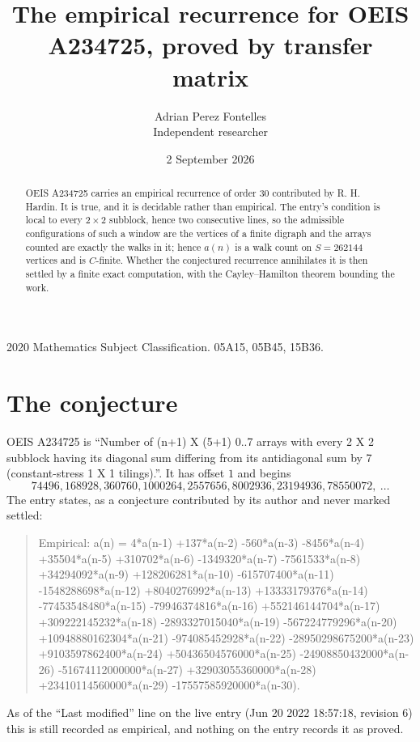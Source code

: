 \documentclass[11pt,a4paper]{article}
\title{The empirical recurrence for OEIS A234725, proved by transfer matrix}
\author{Adrian Perez Fontelles\\ \small Independent researcher}
\date{2 September 2026}
\theoremstyle{plain}
\theoremstyle{definition}
\begin{document}
\maketitle

\begin{abstract}
OEIS A234725 carries an empirical recurrence of order $30$ contributed by R. H. Hardin. It is
true, and it is decidable rather than empirical. The entry's condition is local to every $2\times2$ subblock, hence two consecutive lines, so
the admissible configurations of such a window are the vertices of a finite digraph and the
arrays counted are exactly the walks in it; hence $a(n)$ is a walk count on $S=262144$ vertices
and is $C$-finite. Whether the conjectured recurrence annihilates it is then settled by a
finite exact computation, with the Cayley--Hamilton theorem bounding the work.
\end{abstract}

\noindent\small 2020 Mathematics Subject Classification. 05A15, 05B45, 15B36.\normalsize

\section{The conjecture}

OEIS A234725 is ``Number of (n+1) X (5+1) 0..7 arrays with every 2 X 2 subblock having its diagonal sum differing from its antidiagonal sum by 7 (constant-stress 1 X 1 tilings).''. It has offset $1$ and begins
\[
74496, 168928, 360760, 1000264, 2557656, 8002936, 23194936, 78550072,\ \dots
\]
The entry states, as a conjecture contributed by its author and never marked settled:
\begin{quote}
Empirical: a(n) = 4*a(n-1) +137*a(n-2) -560*a(n-3) -8456*a(n-4) +35504*a(n-5) +310702*a(n-6) -1349320*a(n-7) -7561533*a(n-8) +34294092*a(n-9) +128206281*a(n-10) -615707400*a(n-11) -1548288698*a(n-12) +8040276992*a(n-13) +13333179376*a(n-14) -77453548480*a(n-15) -79946374816*a(n-16) +552146144704*a(n-17) +309222145232*a(n-18) -2893327015040*a(n-19) -567224779296*a(n-20) +10948880162304*a(n-21) -974085452928*a(n-22) -28950298675200*a(n-23) +9103597862400*a(n-24) +50436504576000*a(n-25) -24908850432000*a(n-26) -51674112000000*a(n-27) +32903055360000*a(n-28) +23410114560000*a(n-29) -17557585920000*a(n-30).
\end{quote}
As of the ``Last modified'' line on the live entry (Jun 20 2022 18:57:18, revision 6) this is still
recorded as empirical, and nothing on the entry records it as proved.
\end{document}
